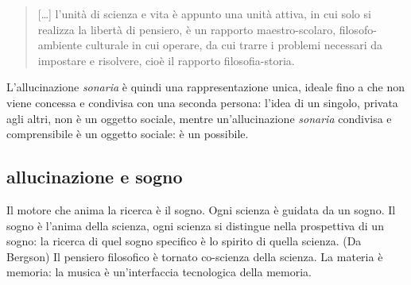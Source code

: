 \begin{quote}
  [\ldots] l'unità di scienza e vita è appunto una unità attiva, in cui solo si
  realizza la libertà di pensiero, è un rapporto maestro-scolaro,
  filosofo-ambiente culturale in cui operare, da cui trarre i problemi necessari
  da impostare e risolvere, cioè il rapporto filosofia-storia. \cite{ag:matst}
\end{quote}%

%

L'allucinazione \emph{sonaria} è quindi una rappresentazione unica, ideale fino
a che non viene concessa e condivisa con una seconda persona: l'idea di un
singolo, privata agli altri, non è un oggetto sociale, mentre un'allucinazione
\emph{sonaria} condivisa e comprensibile è un oggetto sociale: è un possibile.
\cite{ferraris2014}
\subsection{allucinazione e sogno}

Il motore che anima la ricerca è il sogno. Ogni scienza è guidata da un sogno.
Il sogno è l'anima della scienza, ogni scienza si distingue nella prospettiva di
un sogno: la ricerca di quel sogno specifico è lo spirito di quella scienza.
(Da Bergson) Il pensiero filosofico è tornato co-scienza della scienza. La
materia è memoria: la musica è un'interfaccia tecnologica della memoria.

